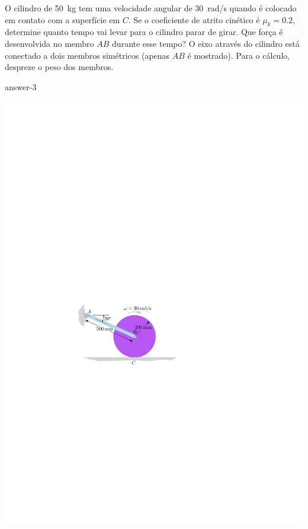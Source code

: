 \item O cilindro de \SI{50}{\kilogram} tem uma velocidade angular de \SI{30}{\radian/\second} quando é colocado em contato com a superfície em $C$. Se o coeficiente de atrito cinético é $\mu_{k}=0.2$, determine quanto tempo vai levar para o cilindro parar de girar. Que força é desenvolvida no membro $AB$ durante esse tempo? O eixo através do cilindro está conectado a dois membros simétricos (apenas $AB$ é mostrado). Para o cálculo, despreze o peso dos membros.

{answer-3}

\vspace{-1.2cm}
\begin{flushright}
	\includegraphics[scale=1.3]{../../images/draw_1_1}
\end{flushright}  
